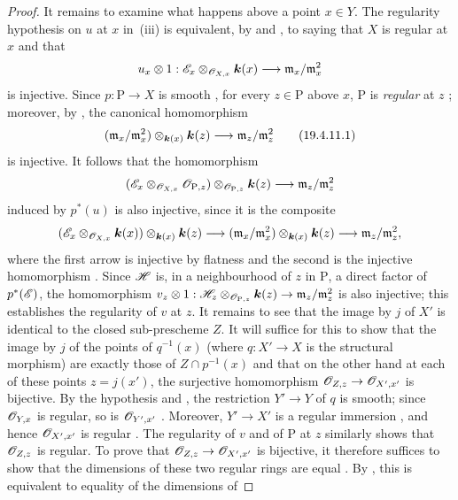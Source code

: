 \begin{proof}
It remains to examine what happens above a point $x\in Y$.
The regularity hypothesis on $u$ at $x$ in~(iii) is equivalent, by  and , to saying that $X$ is regular at $x$ and that
\[
  u_x\otimes1:\mathscr{E}_x\otimes_{\mathscr{O}_{X,x}}\boldsymbol{k}(x)\longrightarrow\mathfrak{m}_x/\mathfrak{m}_x^2
\]
is injective.
Since $p:\mathrm{P}\to X$ is smooth , for every $z\in\mathrm{P}$ above $x$, $\mathrm{P}$ is \emph{regular} at $z$ ; moreover, by , the canonical homomorphism
\[
  (\mathfrak{m}_x/\mathfrak{m}_x^2)\otimes_{\boldsymbol{k}(x)}\boldsymbol{k}(z)\longrightarrow\mathfrak{m}_z/\mathfrak{m}_z^2
  \tag{19.4.11.1}\label{IV.19.4.11.1}
\]
is injective.
It follows that the homomorphism
\[
  (\mathscr{E}_x\otimes_{\mathscr{O}_{X,x}}\mathscr{O}_{\mathrm{P},z})\otimes_{\mathscr{O}_{\mathrm{P},z}}\boldsymbol{k}(z)
  \longrightarrow\mathfrak{m}_z/\mathfrak{m}_z^2
\]
induced by $p^*(u)$ is also injective, since it is the composite
\[
  (\mathscr{E}_x\otimes_{\mathscr{O}_{X,x}}\boldsymbol{k}(x))\otimes_{\boldsymbol{k}(x)}\boldsymbol{k}(z)
  \longrightarrow(\mathfrak{m}_x/\mathfrak{m}_x^2)\otimes_{\boldsymbol{k}(x)}\boldsymbol{k}(z)
  \longrightarrow\mathfrak{m}_z/\mathfrak{m}_z^2,
\]
where the first arrow is injective by flatness and the second is the injective homomorphism .
Since $\mathscr{H}$ is, in a neighbourhood of $z$ in $\mathrm{P}$, a direct factor of $p^*(\mathscr{E})$, the homomorphism
$v_z\otimes1:\mathscr{H}_z\otimes_{\mathscr{O}_{\mathrm{P},z}}\boldsymbol{k}(z)\to\mathfrak{m}_z/\mathfrak{m}_z^2$ is also injective; this establishes the regularity of $v$ at $z$.
It remains to see that the image by $j$ of $X'$ is identical to the closed sub-prescheme $Z$.
It will suffice for this to show that the image by $j$ of the points of $q^{-1}(x)$ (where $q:X'\to X$ is the structural morphism) are exactly those of $Z\cap p^{-1}(x)$ and that on the other hand at each of these points $z=j(x')$, the surjective homomorphism $\mathscr{O}_{Z,z}\to\mathscr{O}_{X',x'}$ is bijective.
By the hypothesis and , the restriction $Y'\to Y$ of $q$ is smooth; since $\mathscr{O}_{Y,x}$ is regular, so is $\mathscr{O}_{Y',x'}$ . Moreover, $Y'\to X'$ is a regular immersion , and hence $\mathscr{O}_{X',x'}$ is regular . The regularity of $v$ and of $\mathrm{P}$ at $z$ similarly shows that $\mathscr{O}_{Z,z}$ is regular.
To prove that $\mathscr{O}_{Z,z}\to\mathscr{O}_{X',x'}$ is bijective, it therefore suffices to show that the dimensions
of these two regular rings are equal .
By , this is equivalent to equality of the dimensions of

\end{proof}
